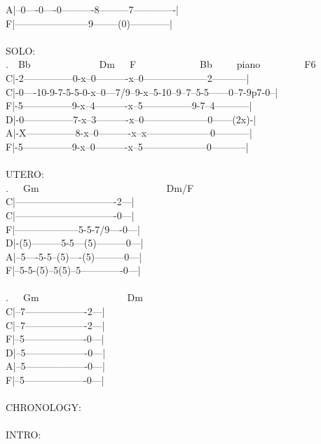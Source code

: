 {A|--0----0----0----------8---------7-------------|\\
F|-----------------------9--------(0)------------|\\
\\
SOLO:\\
.\ \ Bb\ \ \ \ \ \ \ \ \ \ \ \ \ \ Dm\ \ \ F\ \ \ \ \ \ \ \ \ \ \ \ \ Bb\ \ \ \ \ piano\ \ \ \ \ \ \ \ \ F6\\
C|-2---------------0-x--0----------x--0--------------------2-----------|\\
C|-0----10-9-7-5-5-0-x--0---7/9--9-x--5-10--9--7--5-5------0--7-9p7-0--|\\
F|-5---------------9-x--4----------x--5---------------9-7--4-----------|\\
D|-0---------------7-x--3----------x--0--------------------0------(2x)-|\\
A|-X---------------8-x--0----------x--x--------------------0-----------|\\
F|-5---------------9-x--0----------x--5--------------------0-----------|\\
\\
UTERO:\\
.\ \ \ Gm\ \ \ \ \ \ \ \ \ \ \ \ \ \ \ \ \ \ \ \ \ \ \ \ \ \ Dm/F\\
C|-------------------------------2---|\\
C|-------------------------------0---|\\
F|--------------------5-5-7/9----0---|\\
D|-(5)---------5-5---(5)---------0---|\\
A|--5----5-5--(5)----(5)---------0---|\\
F|--5-5-(5)--5(5)--5-------------0---|\\
\\
.\ \ \ Gm\ \ \ \ \ \ \ \ \ \ \ \ \ \ \ \ \ \ Dm\\
C|--7-------------------2---|\\
C|--7-------------------2---|\\
F|--5-------------------0---|\\
D|--5-------------------0---|\\
A|--5-------------------0---|\\
F|--5-------------------0---|\\
\\
CHRONOLOGY:\\
\\
INTRO:\\
\\
}
